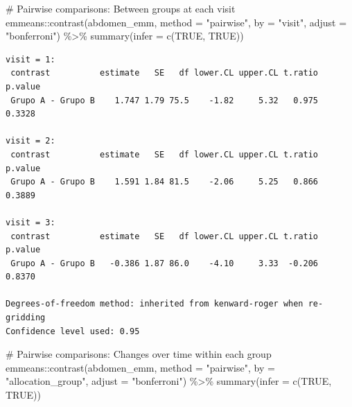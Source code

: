 \documentclass[
  letterpaper,
  DIV=11,
  numbers=noendperiod]{scrartcl}
\newenvironment{Shaded}{\begin{snugshade}}{\end{snugshade}}
\newcommand{\AttributeTok}[1]{\textcolor[rgb]{0.40,0.45,0.13}{#1}}
\newcommand{\CommentTok}[1]{\textcolor[rgb]{0.37,0.37,0.37}{#1}}
\newcommand{\ConstantTok}[1]{\textcolor[rgb]{0.56,0.35,0.01}{#1}}
\newcommand{\FunctionTok}[1]{\textcolor[rgb]{0.28,0.35,0.67}{#1}}
\newcommand{\NormalTok}[1]{\textcolor[rgb]{0.00,0.23,0.31}{#1}}
\newcommand{\SpecialCharTok}[1]{\textcolor[rgb]{0.37,0.37,0.37}{#1}}
\newcommand{\StringTok}[1]{\textcolor[rgb]{0.13,0.47,0.30}{#1}}
\begin{document}
\begin{Shaded}
\begin{Highlighting}[]
\CommentTok{\# Pairwise comparisons: Between groups at each visit}
\NormalTok{emmeans}\SpecialCharTok{::}\FunctionTok{contrast}\NormalTok{(abdomen\_emm, }\AttributeTok{method =} \StringTok{"pairwise"}\NormalTok{, }\AttributeTok{by =} \StringTok{"visit"}\NormalTok{, }\AttributeTok{adjust =} \StringTok{"bonferroni"}\NormalTok{) }\SpecialCharTok{\%\textgreater{}\%} \FunctionTok{summary}\NormalTok{(}\AttributeTok{infer =} \FunctionTok{c}\NormalTok{(}\ConstantTok{TRUE}\NormalTok{, }\ConstantTok{TRUE}\NormalTok{))}
\end{Highlighting}
\end{Shaded}

\begin{verbatim}
visit = 1:
 contrast          estimate   SE   df lower.CL upper.CL t.ratio p.value
 Grupo A - Grupo B    1.747 1.79 75.5    -1.82     5.32   0.975  0.3328

visit = 2:
 contrast          estimate   SE   df lower.CL upper.CL t.ratio p.value
 Grupo A - Grupo B    1.591 1.84 81.5    -2.06     5.25   0.866  0.3889

visit = 3:
 contrast          estimate   SE   df lower.CL upper.CL t.ratio p.value
 Grupo A - Grupo B   -0.386 1.87 86.0    -4.10     3.33  -0.206  0.8370

Degrees-of-freedom method: inherited from kenward-roger when re-gridding 
Confidence level used: 0.95 
\end{verbatim}

\begin{Shaded}
\begin{Highlighting}[]
\CommentTok{\# Pairwise comparisons: Changes over time within each group}
\NormalTok{emmeans}\SpecialCharTok{::}\FunctionTok{contrast}\NormalTok{(abdomen\_emm, }\AttributeTok{method =} \StringTok{"pairwise"}\NormalTok{, }\AttributeTok{by =} \StringTok{"allocation\_group"}\NormalTok{, }\AttributeTok{adjust =} \StringTok{"bonferroni"}\NormalTok{) }\SpecialCharTok{\%\textgreater{}\%} \FunctionTok{summary}\NormalTok{(}\AttributeTok{infer =} \FunctionTok{c}\NormalTok{(}\ConstantTok{TRUE}\NormalTok{, }\ConstantTok{TRUE}\NormalTok{))}
\end{Highlighting}
\end{Shaded}
\end{document}
